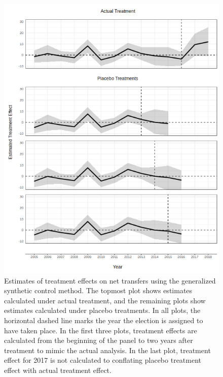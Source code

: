 \documentclass[12pt]{article}
\newcommand{\1}{\mathbbm{1}}
\begin{document}
\begin{figure}[!htbp]
	\centering
	\includegraphics[height=.75\textheight]{figure/190311_synth_results.png}
	\captionsetup{singlelinecheck=off}
	\caption[Estimated synthetic control treatment effects]{Estimates of treatment effects on net transfers using the generalized synthetic control method. The topmost plot shows estimates calculated under actual treatment, and the remaining plots show estimates calculated under placebo treatments. In all plots, the horizontal dashed line marks the year the election is assigned to have taken place. In the first three plots, treatment effects are calculated from the beginning of the panel to two years after treatment to mimic the actual analysis. In the last plot, treatment effect for 2017 is not calculated to conflating placebo treatment effect with actual treatment effect.}
	\label{fig:synth_placebo}
\end{figure}
\end{document}
